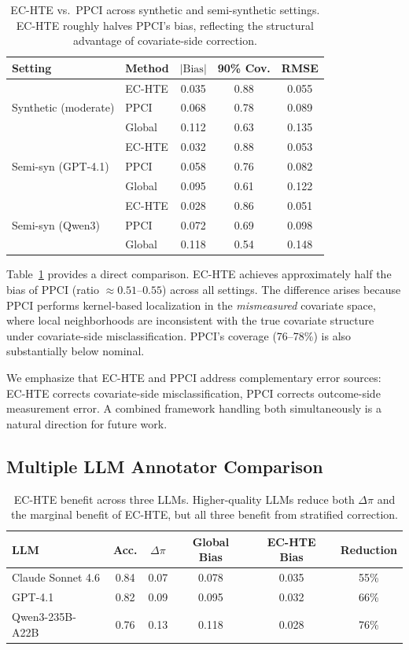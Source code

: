 \documentclass[11pt,a4paper]{article}
\begin{document}
\begin{table}[t]
\centering
\small
\caption{EC-HTE vs.\ PPCI across synthetic and semi-synthetic settings. EC-HTE roughly halves PPCI's bias, reflecting the structural advantage of covariate-side correction.}
\label{tab:ppci}
\begin{tabular}{llccc}
\toprule
Setting & Method & $|\text{Bias}|$ & 90\% Cov. & RMSE \\
\midrule
\multirow{3}{*}{Synthetic (moderate)} & EC-HTE & 0.035 & 0.88 & 0.055 \\
 & PPCI & 0.068 & 0.78 & 0.089 \\
 & Global & 0.112 & 0.63 & 0.135 \\
\midrule
\multirow{3}{*}{Semi-syn (GPT-4.1)} & EC-HTE & 0.032 & 0.88 & 0.053 \\
 & PPCI & 0.058 & 0.76 & 0.082 \\
 & Global & 0.095 & 0.61 & 0.122 \\
\midrule
\multirow{3}{*}{Semi-syn (Qwen3)} & EC-HTE & 0.028 & 0.86 & 0.051 \\
 & PPCI & 0.072 & 0.69 & 0.098 \\
 & Global & 0.118 & 0.54 & 0.148 \\
\bottomrule
\end{tabular}
\end{table}

Table~\ref{tab:ppci} provides a direct comparison.
EC-HTE achieves approximately half the bias of PPCI (ratio $\approx 0.51$--$0.55$) across all settings.
The difference arises because PPCI performs kernel-based localization in the \emph{mismeasured} covariate space, where local neighborhoods are inconsistent with the true covariate structure under covariate-side misclassification.
PPCI's coverage (76--78\%) is also substantially below nominal.

We emphasize that EC-HTE and PPCI address complementary error sources: EC-HTE corrects covariate-side misclassification, PPCI corrects outcome-side measurement error.
A combined framework handling both simultaneously is a natural direction for future work.

\subsection{Multiple LLM Annotator Comparison}
\label{sec:multi_llm}

\begin{table}[t]
\centering
\small
\caption{EC-HTE benefit across three LLMs. Higher-quality LLMs reduce both $\Delta\pi$ and the marginal benefit of EC-HTE, but all three benefit from stratified correction.}
\label{tab:multi_llm}
\begin{tabular}{lccccc}
\toprule
LLM & Acc. & $\Delta\pi$ & Global Bias & EC-HTE Bias & Reduction \\
\midrule
Claude Sonnet 4.6 & 0.84 & 0.07 & 0.078 & 0.035 & 55\% \\
GPT-4.1 & 0.82 & 0.09 & 0.095 & 0.032 & 66\% \\
Qwen3-235B-A22B & 0.76 & 0.13 & 0.118 & 0.028 & 76\% \\
\bottomrule
\end{tabular}
\end{table}
\end{document}
